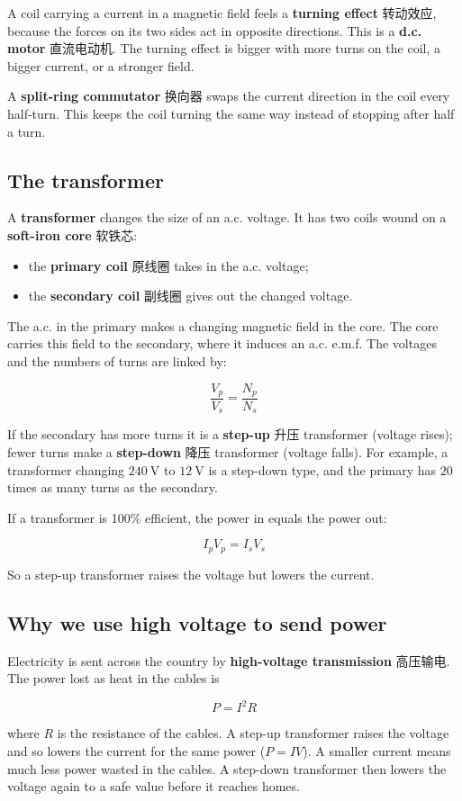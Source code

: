 \documentclass[11pt]{article}
\begin{document}
A coil carrying a current in a magnetic field feels a \textbf{turning effect} 转动效应, because the forces on its two sides act in opposite directions. This is a \textbf{d.c. motor} 直流电动机. The turning effect is bigger with more turns on the coil, a bigger current, or a stronger field.

A \textbf{split-ring commutator} 换向器 swaps the current direction in the coil every half-turn. This keeps the coil turning the same way instead of stopping after half a turn.

\subsection*{The transformer}

A \textbf{transformer} changes the size of an a.c. voltage. It has two coils wound on a \textbf{soft-iron core} 软铁芯:

\begin{itemize}
\item the \textbf{primary coil} 原线圈 takes in the a.c. voltage;

\item the \textbf{secondary coil} 副线圈 gives out the changed voltage.

\end{itemize}

The a.c. in the primary makes a changing magnetic field in the core. The core carries this field to the secondary, where it induces an a.c. e.m.f. The voltages and the numbers of turns are linked by:

\[
\frac{V_p}{V_s} = \frac{N_p}{N_s}
\]

If the secondary has more turns it is a \textbf{step-up} 升压 transformer (voltage rises); fewer turns make a \textbf{step-down} 降压 transformer (voltage falls). For example, a transformer changing $240\ \text{V}$ to $12\ \text{V}$ is a step-down type, and the primary has $20$ times as many turns as the secondary.

If a transformer is 100\% efficient, the power in equals the power out:

\[
I_p V_p = I_s V_s
\]

So a step-up transformer raises the voltage but lowers the current.

\subsection*{Why we use high voltage to send power}

Electricity is sent across the country by \textbf{high-voltage transmission} 高压输电. The power lost as heat in the cables is

\[
P = I^2 R
\]

where $R$ is the resistance of the cables. A step-up transformer raises the voltage and so lowers the current for the same power ($P = IV$). A smaller current means much less power wasted in the cables. A step-down transformer then lowers the voltage again to a safe value before it reaches homes.
\end{document}
